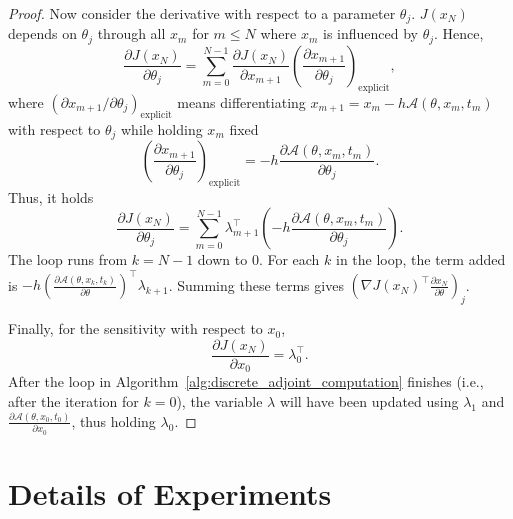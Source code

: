 \documentclass{article}
\newcommand{\Acal}{\mathcal{A}}
\begin{document}
\begin{proof}
Now consider the derivative with respect to a parameter $\theta_j$. $J(x_N)$ depends on $\theta_j$ through all $x_m$ for $m \le N$ where $x_m$ is influenced by $\theta_j$. Hence,
\[ \frac{\partial J(x_N)}{\partial \theta_j} = \sum_{m=0}^{N-1} \frac{\partial J(x_N)}{\partial x_{m+1}} \left(\frac{\partial x_{m+1}}{\partial \theta_j}\right)_{\text{explicit}}, \]
where $(\partial x_{m+1}/\partial \theta_j)_{\text{explicit}}$ means differentiating $x_{m+1} = x_m - h\Acal(\theta, x_m, t_m)$ with respect to $\theta_j$ while holding $x_m$ fixed
\[ \left(\frac{\partial x_{m+1}}{\partial \theta_j}\right)_{\text{explicit}} = -h \frac{\partial \Acal(\theta, x_m, t_m)}{\partial \theta_j}. \]
Thus, it holds
\begin{equation}
    \frac{\partial J(x_N)}{\partial \theta_j} = \sum_{m=0}^{N-1} \lambda_{m+1}^\top \left(-h \frac{\partial \Acal(\theta, x_m, t_m)}{\partial \theta_j}\right).
    \label{eq:pf_grad_theta_sum}
\end{equation}
The loop runs from $k=N-1$ down to $0$. For each $k$ in the loop, the term added is $-h (\frac{\partial \Acal(\theta, x_k, t_k)}{\partial \theta})^\top \lambda_{k+1}$. Summing these terms gives $\left(\nabla J(x_N)^\top \frac{\partial x_N}{\partial \theta}\right)_j$.

Finally, for the sensitivity with respect to $x_0$,
\[ \frac{\partial J(x_N)}{\partial x_0} = \lambda_0^\top. \]
After the loop in Algorithm~\ref{alg:discrete_adjoint_computation} finishes (i.e., after the iteration for $k=0$), the variable $\lambda$ will have been updated using $\lambda_1$ and $\frac{\partial \Acal(\theta, x_0, t_0)}{\partial x_0}$, thus holding $\lambda_0$.
\end{proof}

\section{Details of Experiments}
\label{app:examples}
\end{document}
